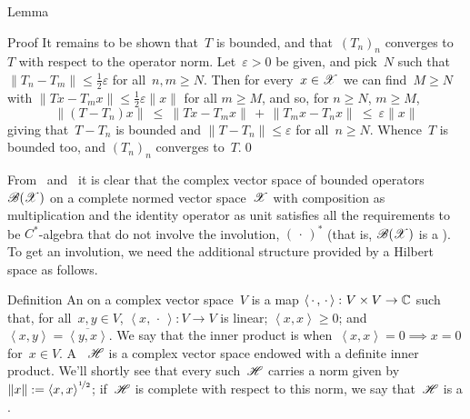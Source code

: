 \documentclass[a]{subfiles}
\begin{document}
\begin{parsec}[hilb]
\begin{point}{Lemma}
\begin{point}{Proof}
It remains to be shown that~$T$ is bounded,
and that~$(T_n)_n$ converges to~$T$ with respect to the operator norm.
Let~$\varepsilon>0$ be given, and pick~$N$ such that
$\|T_n-T_m\|\leq \frac{1}{2}\varepsilon$ for all~$n,m\geq N$.
Then for every~$x\in \mathscr{X}$
we can find~$M\geq N$ with 
$\|T x - T_m x\|\leq \frac{1}{2}\varepsilon\|x\|$ for all $m\geq M$,
and so,
for $n\geq N$, $m\geq M$,
\begin{equation*}
\|(T - T_n) x\| \ \leq\ \|T x - T_mx\|\,+\,\|T_m x - T_n x\|
\ \leq\  \varepsilon\|x\|
\end{equation*}
giving that~$T-T_n$ is bounded
and $\|T-T_n\|\leq \varepsilon$ for all~$n\geq N$.
Whence~$T$ is bounded too,
and $(T_n)_n$ converges to~$T$.\qed
\end{point}
\end{point}
\begin{point}%
From~
and~
it is clear that the complex vector space
of bounded operators~$\mathscr{B}(\mathscr{X})$
on a complete normed vector space~$\mathscr{X}$
with composition as multiplication
and the identity operator as unit
satisfies all the requirements
to be $C^*$-algebra that do not involve the involution, $(\,\cdot\,)^*$
(that is, $\mathscr{B}(\mathscr{X})$ is a ).
To get an involution,
we need the additional structure
provided by a Hilbert space as follows.
\end{point}
\begin{point}{Definition}%
An %
on a complex vector space~$V$ 
is a map $\left<\,\cdot\,,\,\cdot\,\right>\colon V\times V\to \mathbb{C}$%
such that,
for all~$x,y\in V$,
$\left<x,\,\cdot\,\right>\colon V\to V$ is linear;
$\left<x,x\right>\geq 0$;
and
$\left<x,y\right>=\overline{\left<y,x\right>}$.
We say that the inner product is %
when~$\left<x,x\right>=0\implies x=0$ for~$x\in V$.
A ~$\mathscr{H}$%
is a complex vector space endowed with a definite inner product.
We'll shortly see that every such~$\mathscr{H}$
carries a norm
given by
 $\|x\|:= \left<x,x\right>^{\nicefrac{1}{2}}$;
if~$\mathscr{H}$ is complete with respect to this norm,
we say that~$\mathscr{H}$ is a .%


\end{point}
\end{parsec}
\end{document}
